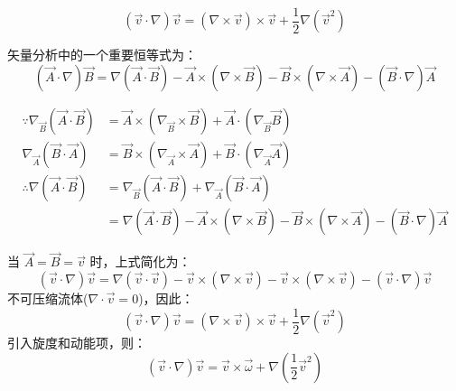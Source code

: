 \documentclass[12pt, a4paper, oneside, UTF8]{ctexbook}  %
\begin{document}
    \begin{lemma}
    \[
    (\vec{v} \cdot \nabla) \vec{v} = (\nabla \times \vec{v}) \times \vec{v} + \frac{1}{2} \nabla (\vec{v}^2)
    \]
    \begin{tui}
矢量分析中的一个重要恒等式为：
\[
(\vec{A} \cdot \nabla) \vec{B} = \nabla (\vec{A} \cdot \vec{B}) - \vec{A} \times (\nabla \times \vec{B}) - \vec{B} \times (\nabla \times \vec{A}) - (\vec{B} \cdot \nabla) \vec{A}
\]
\begin{zhu}
    \begin{align*}
        \because \nabla_{\vec{B}}\left(\vec{A}\cdot\vec{B}\right)&=\vec{A}\times\left(\nabla_{\vec{B}}\times\vec{B}\right)+\vec{A}\cdot\left(\nabla_{\vec{B}}\vec{B}\right)\\
        \nabla_{\vec{A}}\left(\vec{B}\cdot\vec{A}\right)&=\vec{B}\times\left(\nabla_{\vec{A}}\times\vec{A}\right)+\vec{B}\cdot\left(\nabla_{\vec{A}}\vec{A}\right)\\
        \therefore \nabla\left(\vec{A}\cdot\vec{B}\right)&=\nabla_{\vec{B}}\left(\vec{A}\cdot\vec{B}\right)+\nabla_{\vec{A}}\left(\vec{B}\cdot\vec{A}\right)
        \\&=\nabla (\vec{A} \cdot \vec{B}) - \vec{A} \times (\nabla \times \vec{B}) - \vec{B} \times (\nabla \times \vec{A}) - (\vec{B} \cdot \nabla) \vec{A}
    \end{align*}
\end{zhu}
当 \(\vec{A} = \vec{B} = \vec{v}\) 时，上式简化为：
\[
(\vec{v} \cdot \nabla) \vec{v} = \nabla (\vec{v} \cdot \vec{v}) - \vec{v} \times (\nabla \times \vec{v}) - \vec{v} \times (\nabla \times \vec{v}) - (\vec{v} \cdot \nabla) \vec{v}
\]
不可压缩流体(\(\nabla \cdot \vec{v} = 0\))，因此：
\[
(\vec{v} \cdot \nabla) \vec{v} = (\nabla \times \vec{v}) \times \vec{v} + \frac{1}{2} \nabla (\vec{v}^2)
\]
引入旋度和动能项，则：
\[
(\vec{v} \cdot \nabla) \vec{v} = \vec{v} \times \vec{\omega} + \nabla (\frac{1}{2}\vec{v}^2)
\]
    \end{tui}
\end{lemma}
\end{document}
